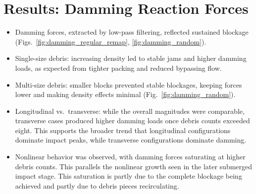 \documentclass{article}
\begin{document}
\section{Results: Damming Reaction Forces}
\begin{itemize}
    \item Damming forces, extracted by low-pass filtering, reflected sustained blockage (Figs.~\ref{fig:damming_regular_remap}, \ref{fig:damming_random}).
    \item Single-size debris: increasing density led to stable jams and higher damming loads, as expected from tighter packing and reduced bypassing flow.
    \item Multi-size debris: smaller blocks prevented stable blockages, keeping forces lower and making density effects minimal (Fig.~\ref{fig:damming_random}).
    \item Longitudinal vs.\ transverse: while the overall magnitudes were comparable, transverse cases produced higher damming loads once debris counts exceeded eight. This supports the broader trend that longitudinal configurations dominate impact peaks, while transverse configurations dominate damming.
    \item Nonlinear behavior was observed, with damming forces saturating at higher debris counts. This parallels the nonlinear growth seen in the later submerged impact stage. This saturation is partly due to the complete blockage being achieved and partly due to debris pieces recirculating.
\end{itemize}
\end{document}
